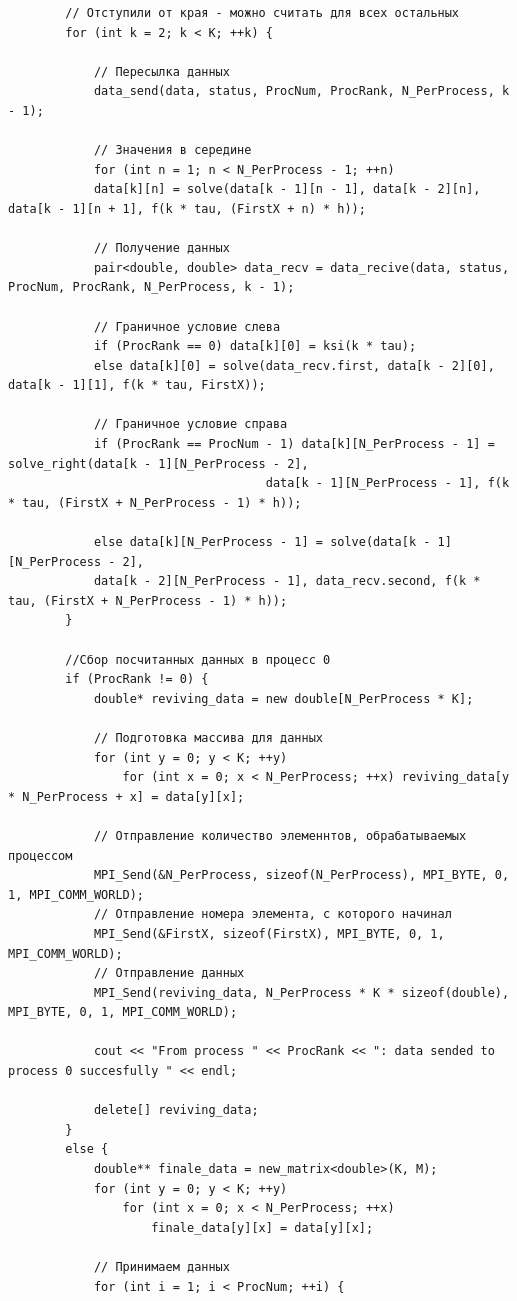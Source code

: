\documentclass[a4paper]{article}
\begin{document}
{\begin{verbatim}
		// Отступили от края - можно считать для всех остальных
		for (int k = 2; k < K; ++k) {
			
			// Пересылка данных
			data_send(data, status, ProcNum, ProcRank, N_PerProcess, k - 1);
	
			// Значения в середине
			for (int n = 1; n < N_PerProcess - 1; ++n) 
			data[k][n] = solve(data[k - 1][n - 1], data[k - 2][n], data[k - 1][n + 1], f(k * tau, (FirstX + n) * h));
	
			// Получение данных
			pair<double, double> data_recv = data_recive(data, status, ProcNum, ProcRank, N_PerProcess, k - 1);
	
			// Граничное условие слева
			if (ProcRank == 0) data[k][0] = ksi(k * tau);
			else data[k][0] = solve(data_recv.first, data[k - 2][0], data[k - 1][1], f(k * tau, FirstX));
	
			// Граничное условие справа 
			if (ProcRank == ProcNum - 1) data[k][N_PerProcess - 1] = solve_right(data[k - 1][N_PerProcess - 2], 
									data[k - 1][N_PerProcess - 1], f(k * tau, (FirstX + N_PerProcess - 1) * h));

			else data[k][N_PerProcess - 1] = solve(data[k - 1][N_PerProcess - 2], 
			data[k - 2][N_PerProcess - 1], data_recv.second, f(k * tau, (FirstX + N_PerProcess - 1) * h));
		}
	
		//Сбор посчитанных данных в процесс 0
		if (ProcRank != 0) {
			double* reviving_data = new double[N_PerProcess * K];
	
			// Подготовка массива для данных
			for (int y = 0; y < K; ++y)
				for (int x = 0; x < N_PerProcess; ++x) reviving_data[y * N_PerProcess + x] = data[y][x];
	
			// Отправление количество элеменнтов, обрабатываемых процессом
			MPI_Send(&N_PerProcess, sizeof(N_PerProcess), MPI_BYTE, 0, 1, MPI_COMM_WORLD);
			// Отправление номера элемента, с которого начинал
			MPI_Send(&FirstX, sizeof(FirstX), MPI_BYTE, 0, 1, MPI_COMM_WORLD);
			// Отправление данных
			MPI_Send(reviving_data, N_PerProcess * K * sizeof(double), MPI_BYTE, 0, 1, MPI_COMM_WORLD);
	
			cout << "From process " << ProcRank << ": data sended to process 0 succesfully " << endl;
	
			delete[] reviving_data;
		}
		else {
			double** finale_data = new_matrix<double>(K, M);
			for (int y = 0; y < K; ++y)
				for (int x = 0; x < N_PerProcess; ++x)
					finale_data[y][x] = data[y][x];
	
			// Принимаем данных
			for (int i = 1; i < ProcNum; ++i) {
	

\end{verbatim}}
\end{document}
